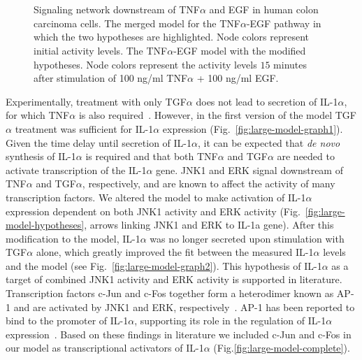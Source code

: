 \begin{figure}[!htpb]
\\
 \\ 
\caption{Signaling network downstream of TNF$\alpha$ and EGF in human colon carcinoma cells.
{\bf \protect{}} The merged model for the TNF$\alpha$-EGF pathway in which the two hypotheses are highlighted. Node colors represent initial activity levels.
{\bf \protect{}} The TNF$\alpha$-EGF model with the modified hypotheses. Node colors represent the activity levels $15$ minutes
after stimulation of 100 ng/ml TNF$\alpha$ + 100 ng/ml EGF.}\label{fig:large-model-all}
\end{figure}


Experimentally,
treatment with only TGF$\alpha$ does not lead to secretion of IL-1$\alpha$, for which
 TNF$\alpha$ is also required~\citep{pathway-autocrine}.
However, in the first version of the model TGF$\alpha$ treatment was sufficient for
 IL-1$\alpha$ expression (Fig.~\ref{fig:large-model-graph1}). Given the time delay until secretion of IL-1$\alpha$, it can be
 expected that \emph{de novo} synthesis of IL-1$\alpha$ is required and that both
 TNF$\alpha$ and TGF$\alpha$ are needed to activate transcription of the IL-1$\alpha$ gene.
 JNK1 and ERK signal downstream of TNF$\alpha$ and TGF$\alpha$, respectively, and are known
to affect the activity of many transcription factors. We altered the model to make
 activation of IL-1$\alpha$ expression dependent on both JNK1 activity and ERK activity
(Fig.~\ref{fig:large-model-hypotheses}, arrows linking {\sf JNK1} and {\sf ERK} to {\sf IL-1a gene}).
 After this modification to the model, IL-1$\alpha$ was no longer secreted
upon stimulation with TGF$\alpha$ alone, which greatly improved the fit between the measured IL-1$\alpha$ levels and the model (see
 Fig.~\ref{fig:large-model-graph2}). This hypothesis of IL-1$\alpha$ as a target of combined JNK1 activity and
 ERK activity is supported in literature. Transcription factors c-Jun and c-Fos together
 form a heterodimer known as AP-1 and are activated by JNK1 and ERK,
respectively~\citep{jnk-signaling,cfos-cjun}. AP-1 has been reported to bind to the
 promoter of IL-1$\alpha$, supporting its role in the regulation of IL-1$\alpha$
 expression~\citep{ap1-il1a}. Based on these findings in literature we included c-Jun and
c-Fos in our model as transcriptional activators of IL-1$\alpha$ (Fig.\ref{fig:large-model-complete}).


